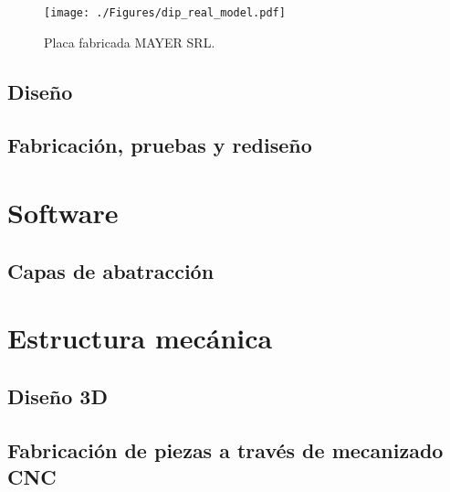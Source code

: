 \begin{figure}[htbp]
	\centering
	\texttt{[image: ./Figures/dip\_real\_model.pdf]}
	\caption{Placa fabricada MAYER SRL.}
	\label{fig:dip_real_model}
\end{figure}

  
\subsection{Diseño}
\subsection{Fabricación, pruebas y rediseño}



\section{Software}

\subsection{Capas de abatracción}



\section{Estructura mecánica}

\subsection{Diseño 3D}
\subsection{Fabricación de piezas a través de mecanizado CNC}



